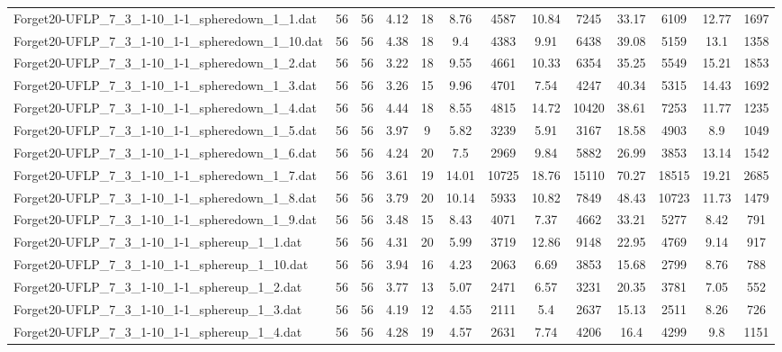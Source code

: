 \begin{table}[!ht]
{\begin{tabular}{lcccccccccccc}
Forget20-UFLP\_7\_3\_1-10\_1-1\_spheredown\_1\_1.dat & 56 & 56 & 4.12 & 18 & 8.76 & 4587 & 10.84 & 7245 & 33.17 & 6109 & 12.77 & 1697 \\
Forget20-UFLP\_7\_3\_1-10\_1-1\_spheredown\_1\_10.dat & 56 & 56 & 4.38 & 18 & 9.4 & 4383 & 9.91 & 6438 & 39.08 & 5159 & 13.1 & 1358 \\
Forget20-UFLP\_7\_3\_1-10\_1-1\_spheredown\_1\_2.dat & 56 & 56 & 3.22 & 18 & 9.55 & 4661 & 10.33 & 6354 & 35.25 & 5549 & 15.21 & 1853 \\
Forget20-UFLP\_7\_3\_1-10\_1-1\_spheredown\_1\_3.dat & 56 & 56 & 3.26 & 15 & 9.96 & 4701 & 7.54 & 4247 & 40.34 & 5315 & 14.43 & 1692 \\
Forget20-UFLP\_7\_3\_1-10\_1-1\_spheredown\_1\_4.dat & 56 & 56 & 4.44 & 18 & 8.55 & 4815 & 14.72 & 10420 & 38.61 & 7253 & 11.77 & 1235 \\
Forget20-UFLP\_7\_3\_1-10\_1-1\_spheredown\_1\_5.dat & 56 & 56 & 3.97 & 9 & 5.82 & 3239 & 5.91 & 3167 & 18.58 & 4903 & 8.9 & 1049 \\
Forget20-UFLP\_7\_3\_1-10\_1-1\_spheredown\_1\_6.dat & 56 & 56 & 4.24 & 20 & 7.5 & 2969 & 9.84 & 5882 & 26.99 & 3853 & 13.14 & 1542 \\
Forget20-UFLP\_7\_3\_1-10\_1-1\_spheredown\_1\_7.dat & 56 & 56 & 3.61 & 19 & 14.01 & 10725 & 18.76 & 15110 & 70.27 & 18515 & 19.21 & 2685 \\
Forget20-UFLP\_7\_3\_1-10\_1-1\_spheredown\_1\_8.dat & 56 & 56 & 3.79 & 20 & 10.14 & 5933 & 10.82 & 7849 & 48.43 & 10723 & 11.73 & 1479 \\
Forget20-UFLP\_7\_3\_1-10\_1-1\_spheredown\_1\_9.dat & 56 & 56 & 3.48 & 15 & 8.43 & 4071 & 7.37 & 4662 & 33.21 & 5277 & 8.42 & 791 \\
Forget20-UFLP\_7\_3\_1-10\_1-1\_sphereup\_1\_1.dat & 56 & 56 & 4.31 & 20 & 5.99 & 3719 & 12.86 & 9148 & 22.95 & 4769 & 9.14 & 917 \\
Forget20-UFLP\_7\_3\_1-10\_1-1\_sphereup\_1\_10.dat & 56 & 56 & 3.94 & 16 & 4.23 & 2063 & 6.69 & 3853 & 15.68 & 2799 & 8.76 & 788 \\
Forget20-UFLP\_7\_3\_1-10\_1-1\_sphereup\_1\_2.dat & 56 & 56 & 3.77 & 13 & 5.07 & 2471 & 6.57 & 3231 & 20.35 & 3781 & 7.05 & 552 \\
Forget20-UFLP\_7\_3\_1-10\_1-1\_sphereup\_1\_3.dat & 56 & 56 & 4.19 & 12 & 4.55 & 2111 & 5.4 & 2637 & 15.13 & 2511 & 8.26 & 726 \\
Forget20-UFLP\_7\_3\_1-10\_1-1\_sphereup\_1\_4.dat & 56 & 56 & 4.28 & 19 & 4.57 & 2631 & 7.74 & 4206 & 16.4 & 4299 & 9.8 & 1151 \\

\end{tabular}}
\end{table}
